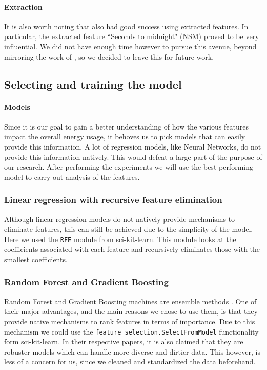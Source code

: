 \documentclass[british]{article}
\newcommand{\code}[1]{\texttt{#1}}
\begin{document}
	\paragraph{Extraction} It is also worth noting that \citeauthor{Willmott2009} also had good success using extracted features. In particular, the extracted feature ``Seconds to midnight" (NSM) proved to be very influential. We did not have enough time however to pursue this avenue, beyond mirroring the work of  \autocite{Candanedo2017}, so we decided to leave this for future work. 
	
	\subsection{Selecting and training the model}
	\label{modelSelection}
	\paragraph{Models}Since it is our goal to gain a better understanding of how the various features impact the overall energy usage, it behoves us to pick models that can easily provide this information. A lot of regression models, like Neural Networks, do not provide this information natively. This would defeat a large part of the purpose of our research. After performing the experiments we will use the best performing model to carry out analysis of the features. 
	
	\subsubsection{Linear regression with recursive feature elimination} Although linear regression models do not natively provide mechanisms to eliminate features, this can still be achieved due to the simplicity of the model. Here we used the \code{RFE} module from sci-kit-learn. This module looks at the coefficients associated with each feature and recursively eliminates those with the smallest coefficients. 
	
	\subsubsection{Random Forest and Gradient Boosting} Random Forest and Gradient Boosting machines are ensemble methods \autocite{Breiman2001,Jeromeh1999}. One of their major advantages, and the main reasons we chose to use them, is that they provide native mechanisms to rank features in terms of importance. Due to this mechanism we could use the \code{feature\_selection.SelectFromModel} functionality form sci-kit-learn. In their respective papers, it is also claimed that they are robuster models which can handle more diverse and dirtier data. This however, is less of a concern for us, since we cleaned and standardized the data beforehand. 
	
\end{document}
